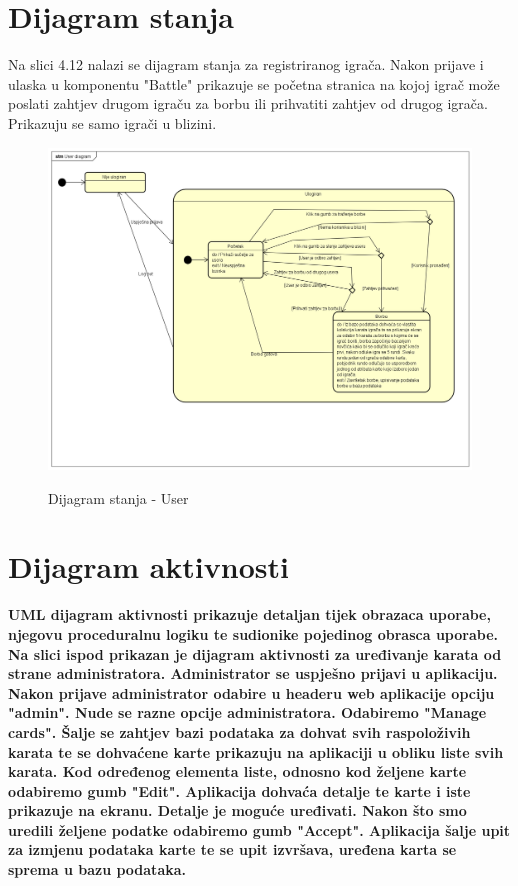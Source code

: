 			\eject
		
		\section{Dijagram stanja}
			
			
			\textnormal{Na slici 4.12 nalazi se dijagram stanja za registriranog igrača. Nakon prijave i ulaska u komponentu "Battle" prikazuje se početna stranica na kojoj igrač može poslati zahtjev drugom igraču za borbu ili prihvatiti zahtjev od drugog igrača. Prikazuju se samo igrači u blizini.  }
			
						\begin{figure}[H]
				\centering
				\includegraphics[scale=0.58]{dijagrami/user_diagram} \\
				\caption{Dijagram stanja - User}
				\label{fig:user}
			\end{figure}
			
			
			\eject 
		
		\section{Dijagram aktivnosti}
			
			\textbf{\textnormal{UML dijagram aktivnosti prikazuje detaljan tijek obrazaca uporabe, njegovu proceduralnu logiku te sudionike pojedinog obrasca uporabe. Na slici ispod prikazan je dijagram aktivnosti za uređivanje karata od strane administratora. Administrator se uspješno prijavi u aplikaciju. Nakon prijave administrator odabire u headeru web aplikacije opciju "admin". Nude se razne opcije administratora. Odabiremo "Manage cards". Šalje se zahtjev bazi podataka za dohvat svih raspoloživih karata te se dohvaćene karte prikazuju na aplikaciji u obliku liste svih karata. Kod određenog elementa liste, odnosno kod željene karte odabiremo gumb "Edit". Aplikacija dohvaća detalje te karte i iste prikazuje na ekranu. Detalje je moguće uređivati. Nakon što smo uredili željene podatke odabiremo gumb "Accept". Aplikacija šalje upit za izmjenu podataka karte te se upit izvršava, uređena karta se sprema u bazu podataka.}}\\

